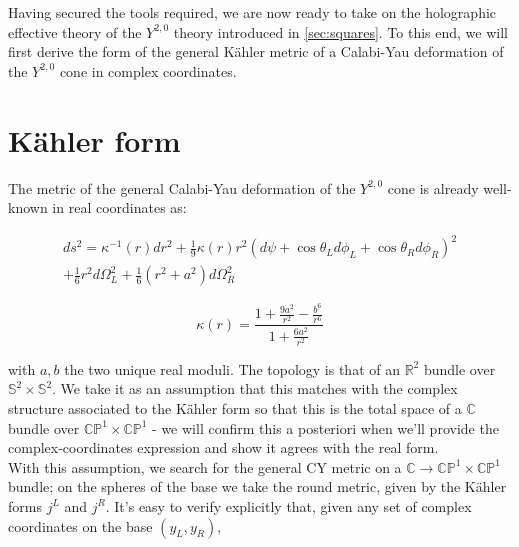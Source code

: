 %
%
%
\graphicspath{{images/}}
%



%

Having secured the tools required, we are now ready to take on the holographic effective theory of the $Y^{2,0}$ theory introduced in \ref{sec:squares}. To this end, we will first derive the form of the general K\"ahler metric of a Calabi-Yau deformation of the $Y^{2,0}$ cone in complex coordinates.

\section{K\"ahler form}

The metric of the general Calabi-Yau deformation of the $Y^{2,0}$ cone is already well-known in real coordinates as:

\begin{multline}
ds^2 = \kappa^{-1}(r)dr^2 + \frac{1}{9} \kappa(r) r^2 \left(d\psi + \cos\theta_L d\phi_L + \cos\theta_R d\phi_R\right)^2\\
+ \frac{1}{6} r^2 d\Omega_L^2 + \frac{1}{6}(r^2+a^2) d\Omega_R^2 \label{y20metric} 
\end{multline}

\begin{equation}
	\kappa(r) = \frac{1 + \frac{9a^2}{r^2} - \frac{b^6}{r^6}}{1+ \frac{6a^2}{r^2}}
\end{equation}

with $a,b$ the two unique real moduli. The topology is that of an $\mathbb{R}^2$ bundle over $\mathbb{S}^2 \times \mathbb{S}^2$. We take it as an assumption that this matches with the complex structure associated to the K\"ahler form so that this is the total space of a $\mathbb{C}$ bundle over $\mathbb{CP}^1 \times \mathbb{CP}^1$ - we will confirm this a posteriori when we'll provide the complex-coordinates expression and show it agrees with the real form.\\

With this assumption, we search for the general CY metric on a $\mathbb{C} \rightarrow \mathbb{CP}^1 \times \mathbb{CP}^1$ bundle; on the spheres of the base we take the round metric, given by the K\"ahler forms $j^L$ and $j^R$. It's easy to verify explicitly that, given any set of complex coordinates on the base $(y_L,y_R)$,

